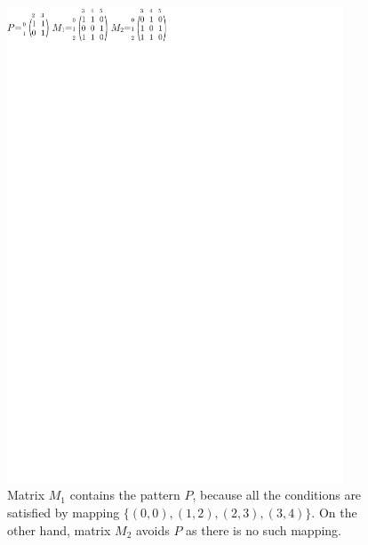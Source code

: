 \begin{figure}[h!]
\centering
\includegraphics[width=100mm]{../img/avoiding.pdf}
\caption{Matrix $M_1$ contains the pattern $P$, because all the conditions are satisfied by mapping $\{(0,0),(1,2),(2,3),(3,4)\}$. On the other hand, matrix $M_2$ avoids $P$ as there is no such mapping.}
\label{avoiding}
\end{figure}

